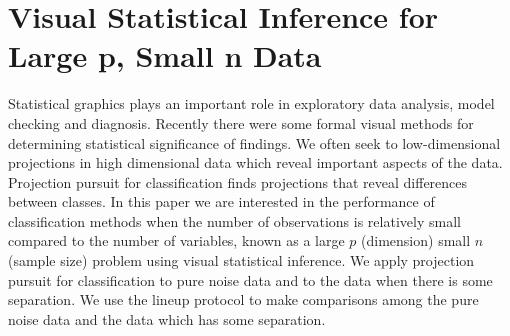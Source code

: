 \documentclass[12]{report}
\begin{document}
%
%
%
%
%
 


\chapter{Visual Statistical Inference for Large p, Small n Data}\label{ch:largepsmalln}


Statistical graphics plays an important role in exploratory data analysis, model checking and diagnosis. Recently there were some formal visual methods for determining statistical significance of findings. We often seek to low-dimensional projections in high dimensional data which reveal important aspects of the data. Projection pursuit for classification finds projections that reveal differences between classes. In this paper we are interested in the performance of classification methods when the number of observations is relatively small compared to the number of variables, known as a large $p$ (dimension) small $n$ (sample size) problem using visual statistical inference. We apply projection pursuit for classification to pure noise data and to the data when there is some separation. We use the lineup protocol \cite{buja:2009} to make comparisons among the pure noise data and the data which has some separation.
\end{document}
